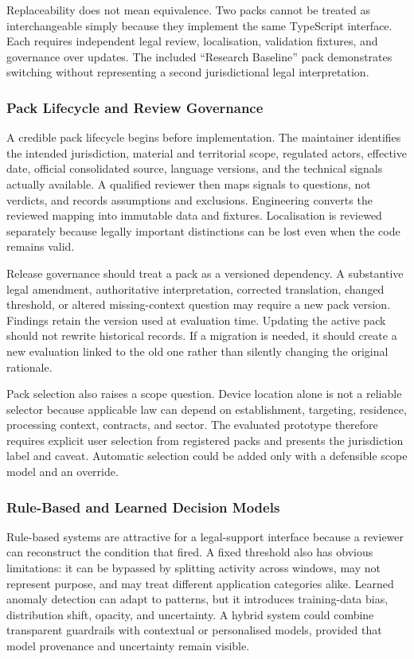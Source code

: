 Replaceability does not mean equivalence. Two packs cannot be treated as interchangeable simply because they implement the same TypeScript interface. Each requires independent legal review, localisation, validation fixtures, and governance over updates. The included ``Research Baseline'' pack demonstrates switching without representing a second jurisdictional legal interpretation.

\subsubsection{Pack Lifecycle and Review Governance}

A credible pack lifecycle begins before implementation. The maintainer identifies the intended jurisdiction, material and territorial scope, regulated actors, effective date, official consolidated source, language versions, and the technical signals actually available. A qualified reviewer then maps signals to questions, not verdicts, and records assumptions and exclusions. Engineering converts the reviewed mapping into immutable data and fixtures. Localisation is reviewed separately because legally important distinctions can be lost even when the code remains valid.

Release governance should treat a pack as a versioned dependency. A substantive legal amendment, authoritative interpretation, corrected translation, changed threshold, or altered missing-context question may require a new pack version. Findings retain the version used at evaluation time. Updating the active pack should not rewrite historical records. If a migration is needed, it should create a new evaluation linked to the old one rather than silently changing the original rationale.

Pack selection also raises a scope question. Device location alone is not a reliable selector because applicable law can depend on establishment, targeting, residence, processing context, contracts, and sector. The evaluated prototype therefore requires explicit user selection from registered packs and presents the jurisdiction label and caveat. Automatic selection could be added only with a defensible scope model and an override.

\subsubsection{Rule-Based and Learned Decision Models}

Rule-based systems are attractive for a legal-support interface because a reviewer can reconstruct the condition that fired. A fixed threshold also has obvious limitations: it can be bypassed by splitting activity across windows, may not represent purpose, and may treat different application categories alike. Learned anomaly detection can adapt to patterns, but it introduces training-data bias, distribution shift, opacity, and uncertainty. A hybrid system could combine transparent guardrails with contextual or personalised models, provided that model provenance and uncertainty remain visible.

